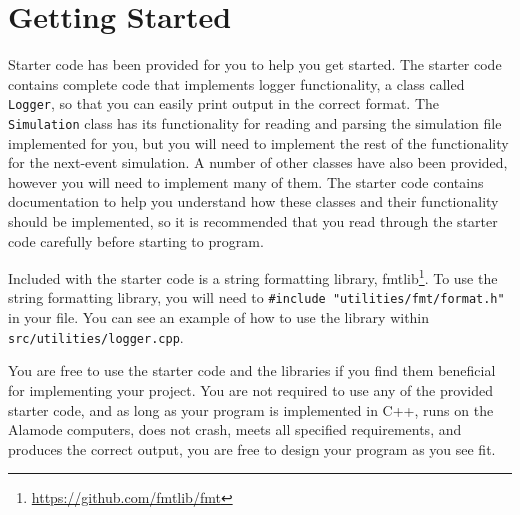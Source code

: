 \documentclass[main.tex]{subfiles}
\begin{document}
\section{Getting Started}
\label{sec:started}

Starter code has been provided for you to help you get started. The starter code contains complete code that implements logger functionality, a class called \texttt{Logger}, so that you can easily print output in the correct format. The \texttt{Simulation} class has its functionality for reading and parsing the simulation file implemented for you, but you will need to implement the rest of the functionality for the next-event simulation. A number of other classes have also been provided, however you will need to implement many of them. The starter code contains documentation to help you understand how these classes and their functionality should be implemented, so it is recommended that you read through the starter code carefully before starting to program.

Included with the starter code is a string formatting library, fmtlib\footnote{\url{https://github.com/fmtlib/fmt}}. To use the string formatting library, you will need to \texttt{\#include "utilities/fmt/format.h"} in your file. You can see an example of how to use the library within \texttt{src/utilities/logger.cpp}.


You are free to use the starter code and the libraries if you find them beneficial for implementing your project. You are not required to use any of the provided starter code, and as long as your program is implemented in  C++, runs on the Alamode computers, does not crash, meets all specified requirements, and produces the correct output, you are free to design your program as you see fit.

\end{document}
